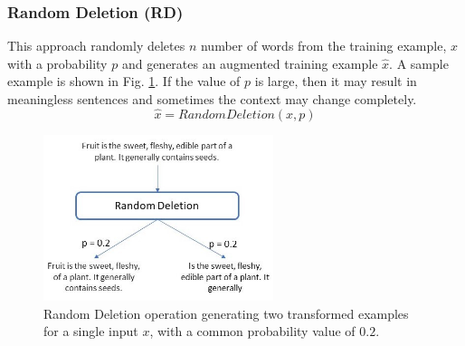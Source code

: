 \documentclass{article}
\begin{document}
\subsubsection{Random Deletion (RD)}
This approach randomly deletes $n$ number of words from the training example, $x$ with a probability $p$ and generates an augmented training example $\hat{x}$. A sample example is shown in Fig. \ref{fig:randomdelete}. If the value of $p$ is large, then it may result in meaningless sentences and sometimes the context may change completely.
\begin{equation}
\hat{x} = RandomDeletion(x, p)
\end{equation}
\begin{figure}[h!]
\centering
  \includegraphics[width=0.6\textwidth]{randomdelete.jpg}
  \caption{Random Deletion operation generating two transformed examples for a single input $x$, with a common probability value of $0.2$.}
  \label{fig:randomdelete}
\end{figure}
\end{document}
